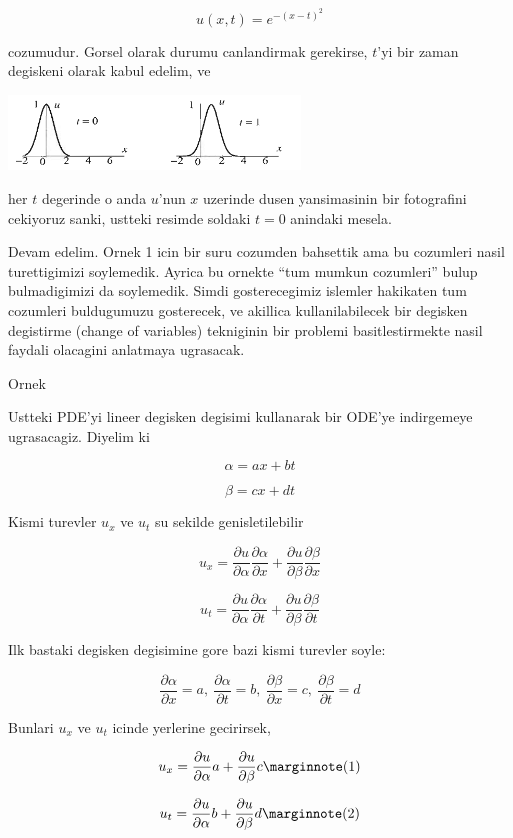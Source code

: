 \documentclass[12pt,fleqn]{article}\usepackage{../common}
\begin{document}
\[ u(x,t) =  e^{-(x-t)^2} \]

cozumudur. Gorsel olarak durumu canlandirmak gerekirse, $t$'yi bir zaman
degiskeni olarak kabul edelim, ve 

\includegraphics[height=2cm]{1_3.png}

her $t$ degerinde o anda $u$'nun $x$ uzerinde dusen yansimasinin bir
fotografini cekiyoruz sanki, ustteki resimde soldaki $t=0$ anindaki
mesela. 

Devam edelim. Ornek 1 icin bir suru cozumden bahsettik ama bu cozumleri
nasil turettigimizi soylemedik. Ayrica bu ornekte ``tum mumkun cozumleri''
bulup bulmadigimizi da soylemedik. Simdi gosterecegimiz islemler hakikaten
tum cozumleri buldugumuzu gosterecek, ve akillica kullanilabilecek bir
degisken degistirme (change of variables) tekniginin bir problemi
basitlestirmekte nasil faydali olacagini anlatmaya ugrasacak. 

Ornek

Ustteki PDE'yi lineer degisken degisimi kullanarak bir ODE'ye indirgemeye
ugrasacagiz. Diyelim ki

\[ \alpha = a x + b t \]

\[ \beta = cx + dt \]

Kismi turevler $u_x$ ve $u_t$ su sekilde genisletilebilir

\[ u_x = 
\frac{\partial u}{\partial \alpha}\frac{\partial \alpha}{\partial x}  +
\frac{\partial u}{\partial \beta}\frac{\partial \beta}{\partial x} 
\]


\[ u_t = 
\frac{\partial u}{\partial \alpha}\frac{\partial \alpha}{\partial t}  +
\frac{\partial u}{\partial \beta}\frac{\partial \beta}{\partial t} 
\]

Ilk bastaki degisken degisimine gore bazi kismi turevler soyle:

\[ \frac{\partial \alpha}{\partial x} = a , \ \frac{\partial \alpha}{\partial t} = b, \ \frac{\partial \beta}{\partial x} = c , \
\frac{\partial \beta}{\partial t} = d 
\]

Bunlari $u_x$ ve $u_t$ icinde yerlerine gecirirsek,

\[ u_x = 
\frac{\partial u}{\partial \alpha} a +
\frac{\partial u}{\partial \beta} c
\mlabel{1}
\]

\[ u_t = 
\frac{\partial u}{\partial \alpha} b +
\frac{\partial u}{\partial \beta} d
\mlabel{2}
\]
\end{document}
